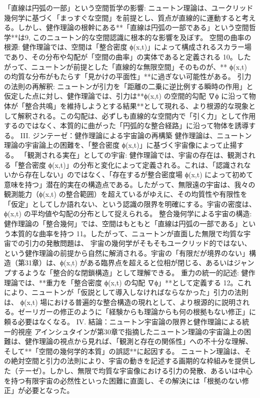 \documentclass{article}
\begin{document}
「直線は円弧の一部」という空間哲学の影響:
ニュートン理論は、ユークリッド幾何学に基づく「まっすぐな空間」を前提とし、質点が直線的に運動すると考える。しかし、健作理論の根幹にある**「直線は円弧の一部である」という空間哲学**は9, このニュートン的な空間認識に根本的な影響を及ぼす。
空間の曲率の根源: 健作理論では、空間は「整合密度 ϕ(x,t)」によって構成されるスカラー場であり、その分布や勾配が「空間の曲率」の実体であると定義される 10。したがって、ニュートンが前提とした「直線的な無限空間」そのものが、**
ϕ(x,t) の均質な分布がもたらす「見かけの平面性」**に過ぎない可能性がある。
引力の法則の再解釈: ニュートンが引力を「距離の二乗に逆比例する瞬時の作用」と仮定した点に対し、健作理論では、引力は**ϕ(x,t) の空間的勾配 ∇ϕ に沿って物体が「整合共鳴」を維持しようとする結果**として現れる、より根源的な現象として解釈される。この勾配は、必ずしも直線的な空間内で「引く力」として作用するのではなく、本質的に曲がった「円弧的な整合経路」に沿って物体を誘導する。
III. ジンテーゼ：健作理論による宇宙論の再構築
健作理論は、ニュートン理論の宇宙論上の困難を、「整合密度 ϕ(x,t)」に基づく宇宙像によって止揚する。
「観測される実在」としての宇宙:
健作理論では、宇宙の存在は、観測される「整合密度 ϕ(x,t)」の分布と変化によって定義される。これは、「認識されないから存在しない」のではなく、「存在するが整合密度場 ϕ(x,t) によって初めて意味を持つ」潜在的実在の構造点である。したがって、無限遠の宇宙は、我々の観測能力（ϕ(x,t) の整合範囲）を超えているがゆえに、その均質性や有限性を「仮定」としてしか語れない、という認識の限界を明確にする。宇宙の密度は、ϕ(x,t) の平均値や勾配の分布として捉えられる。
整合幾何学による宇宙の構造:
健作理論の「整合幾何」では、空間はもともと「直線は円弧の一部である」という本質的な曲率を持つ 11。したがって、ニュートンが直面した無限で均質な宇宙での引力の発散問題は、
宇宙の幾何学がそもそもユークリッド的ではない、という健作理論の前提から自然に解消される。宇宙の「有限だが境界のない」構造（第31章）は、ϕ(x,t) がある臨界点を超えると位相が閉じる、あるいはジャンプするような「整合的な閉鎖構造」として理解できる。
重力の統一的記述:
健作理論では、**重力を「整合密度 
ϕ(x,t) の勾配 ∇ϕ」**として定義する 12。これにより、ニュートンが「仮説として導入しなければならなかった」引力の法則は、
ϕ(x,t) 場における普遍的な整合構造の現れとして、より根源的に説明される。ゼーリガーの修正のように「経験からも理論からも何の根拠もない修正」に頼る必要はなくなる。
IV. 結論：ニュートン宇宙論の限界と健作理論による統一的視座
アインシュタインが第30章で指摘したニュートン理論の宇宙論上の困難は、健作理論の視点から見れば、「観測と存在の関係性」への不十分な理解、そして**「空間の幾何学的本質」の誤認**に起因する。
ニュートン理論は、その絶対空間と引力の法則により、宇宙の動きを記述する画期的な枠組みを提供した（テーゼ）。しかし、無限で均質な宇宙像における引力の発散、あるいは中心を持つ有限宇宙の必然性といった困難に直面し、その解決には「根拠のない修正」が必要となった。
\end{document}
